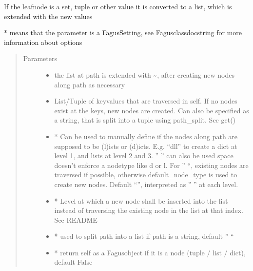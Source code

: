 \documentclass[a4paper,10pt,english]{sphinxmanual}
\begin{document}
\begin{fulllineitems}
\begin{fulllineitems}
\sphinxAtStartPar
If the leaf\sphinxhyphen{}node is a set, tuple or other value it is converted to a list, which is extended with the new values

\sphinxAtStartPar
* means that the parameter is a Fagus\sphinxhyphen{}Setting, see Fagus\sphinxhyphen{}class\sphinxhyphen{}docstring for more information about options
\begin{quote}\begin{description}
\item[{Parameters}] \leavevmode\begin{itemize}
\item {}
\sphinxAtStartPar
{} \textendash{} the list at path is extended with \textasciitilde{}, after creating new nodes along path as necessary

\item {}
\sphinxAtStartPar
{} \textendash{} List/Tuple of key\sphinxhyphen{}values that are traversed in self. If no nodes exist at the keys, new nodes are
created. Can also be specified as a string, that is split into a tuple using path\_split. See get()

\item {}
\sphinxAtStartPar
{} \textendash{} * Can be used to manually define if the nodes along path are supposed to be (l)ists or
(d)icts. E.g. “dll” to create a dict at level 1, and lists at level 2 and 3. ” ” can also be used \sphinxhyphen{}
space doesn’t enforce a node\sphinxhyphen{}type like d or l. For ” “, existing nodes are traversed if possible,
otherwise default\_node\_type is used to create new nodes. Default “”, interpreted as ” ” at each level.

\item {}
\sphinxAtStartPar
{} \textendash{} * Level at which a new node shall be inserted into the list instead of traversing the
existing node in the list at that index. See README

\item {}
\sphinxAtStartPar
{} \textendash{} * used to split path into a list if path is a string, default ” “

\item {}
\sphinxAtStartPar
{} \textendash{} * return self as a Fagus\sphinxhyphen{}object if it is a node (tuple / list / dict), default False


\end{itemize}
\end{description}
\end{quote}
\end{fulllineitems}
\end{fulllineitems}
\end{document}
